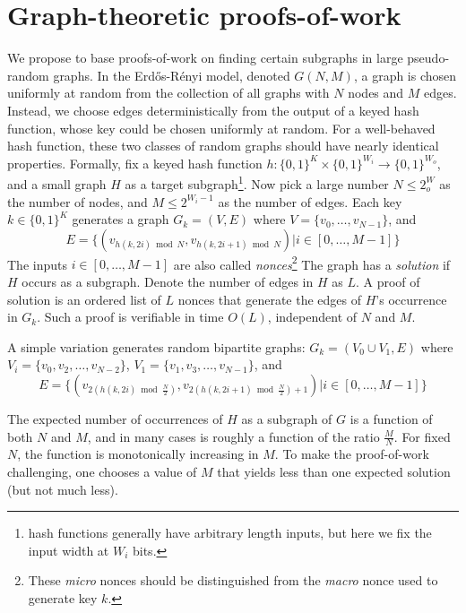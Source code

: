 \documentclass[11pt, oneside]{article}
\begin{document}
\section{Graph-theoretic proofs-of-work}
We propose to base proofs-of-work on finding certain subgraphs in large pseudo-random graphs.
In the Erd\H{o}s-R\'{e}nyi model, denoted $G(N,M)$, a graph is chosen uniformly at random
from the collection of all graphs with $N$ nodes and $M$ edges. Instead, we choose edges
deterministically from the output of a keyed hash function, whose key could be chosen
uniformly at random. For a well-behaved hash function, these two classes of random graphs
should have nearly identical properties.
Formally, fix a keyed hash function
$h: \{0,1\}^K \times \{0,1\}^{W_i} \rightarrow \{0,1\}^{W_o}$,
and a small graph $H$ as a target subgraph\footnote{hash functions generally have arbitrary length inputs,
but here we fix the input width at $W_i$ bits.}.
Now pick a large number $N \leq 2^W_o$ as the number of nodes,
and $M \leq 2^{W_i-1}$ as the number of edges.
Each key $k \in \{0,1\}^K$ generates a graph $G_k = (V,E)$ where $V=\{v_0,\ldots,v_{N-1}\}$, and
\begin{equation}
E=\{(v_{h(k,2i) \bmod N},v_{h(k,2i+1) \bmod N}) | i \in [0,\ldots,M-1]\}
\end{equation}
The inputs $i \in [0,\ldots,M-1]$ are also called {\em nonces}\footnote{These {\em micro} nonces should be
distinguished from the {\em macro} nonce used to generate key $k$.}
The graph has a {\em solution} if $H$ occurs as a subgraph.
Denote the number of edges in $H$ as $L$.
A proof of solution is an ordered list of $L$ nonces that generate the edges
of $H$'s occurrence in $G_k$.
Such a proof is verifiable in time $O(L)$, independent of $N$ and $M$.

A simple variation generates random bipartite graphs:
$G_k = (V_0 \cup V_1,E)$ where $V_i=\{v_0,v_2,\ldots,v_{N-2}\}$, $V_1=\{v_1,v_3,\ldots,v_{N-1}\}$,
and
\begin{equation}
E=\{(v_{2(h(k,2i) \bmod \frac{N}{2})}, v_{2(h(k,2i+1) \bmod \frac{N}{2})+1}) | i \in [0,\ldots,M-1]\}
\end{equation}

The expected number of occurrences of $H$ as a subgraph of $G$ is a function of both $N$ and $M$,
and in many cases is roughly a function of the ratio $\frac{M}{N}$.
For fixed $N$, the function is monotonically increasing in $M$.
To make the proof-of-work challenging, one chooses a value of $M$ that yields less than one
expected solution (but not much less).
\end{document}
